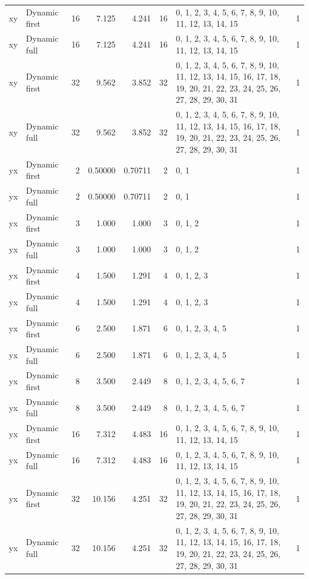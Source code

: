 \documentclass[10pt,a4paper]{article}
\begin{document}
\begin{longtable}{@{}p{23mm}p{29mm}rrrrp{36mm}r@{}}
xy & Dynamic first & 16 & 7.125 & 4.241 & 16 & 0, 1, 2, 3, 4, 5, 6, 7, 8, 9, 10, 11, 12, 13, 14, 15 & 1 \\
xy & Dynamic full & 16 & 7.125 & 4.241 & 16 & 0, 1, 2, 3, 4, 5, 6, 7, 8, 9, 10, 11, 12, 13, 14, 15 & 1 \\
xy & Dynamic first & 32 & 9.562 & 3.852 & 32 & 0, 1, 2, 3, 4, 5, 6, 7, 8, 9, 10, 11, 12, 13, 14, 15, 16, 17, 18, 19, 20, 21, 22, 23, 24, 25, 26, 27, 28, 29, 30, 31 & 1 \\
xy & Dynamic full & 32 & 9.562 & 3.852 & 32 & 0, 1, 2, 3, 4, 5, 6, 7, 8, 9, 10, 11, 12, 13, 14, 15, 16, 17, 18, 19, 20, 21, 22, 23, 24, 25, 26, 27, 28, 29, 30, 31 & 1 \\
yx & Dynamic first & 2 & 0.50000 & 0.70711 & 2 & 0, 1 & 1 \\
yx & Dynamic full & 2 & 0.50000 & 0.70711 & 2 & 0, 1 & 1 \\
yx & Dynamic first & 3 & 1.000 & 1.000 & 3 & 0, 1, 2 & 1 \\
yx & Dynamic full & 3 & 1.000 & 1.000 & 3 & 0, 1, 2 & 1 \\
yx & Dynamic first & 4 & 1.500 & 1.291 & 4 & 0, 1, 2, 3 & 1 \\
yx & Dynamic full & 4 & 1.500 & 1.291 & 4 & 0, 1, 2, 3 & 1 \\
yx & Dynamic first & 6 & 2.500 & 1.871 & 6 & 0, 1, 2, 3, 4, 5 & 1 \\
yx & Dynamic full & 6 & 2.500 & 1.871 & 6 & 0, 1, 2, 3, 4, 5 & 1 \\
yx & Dynamic first & 8 & 3.500 & 2.449 & 8 & 0, 1, 2, 3, 4, 5, 6, 7 & 1 \\
yx & Dynamic full & 8 & 3.500 & 2.449 & 8 & 0, 1, 2, 3, 4, 5, 6, 7 & 1 \\
yx & Dynamic first & 16 & 7.312 & 4.483 & 16 & 0, 1, 2, 3, 4, 5, 6, 7, 8, 9, 10, 11, 12, 13, 14, 15 & 1 \\
yx & Dynamic full & 16 & 7.312 & 4.483 & 16 & 0, 1, 2, 3, 4, 5, 6, 7, 8, 9, 10, 11, 12, 13, 14, 15 & 1 \\
yx & Dynamic first & 32 & 10.156 & 4.251 & 32 & 0, 1, 2, 3, 4, 5, 6, 7, 8, 9, 10, 11, 12, 13, 14, 15, 16, 17, 18, 19, 20, 21, 22, 23, 24, 25, 26, 27, 28, 29, 30, 31 & 1 \\
yx & Dynamic full & 32 & 10.156 & 4.251 & 32 & 0, 1, 2, 3, 4, 5, 6, 7, 8, 9, 10, 11, 12, 13, 14, 15, 16, 17, 18, 19, 20, 21, 22, 23, 24, 25, 26, 27, 28, 29, 30, 31 & 1 \\
\end{longtable}\normalsize\setlength{\tabcolsep}{6pt}
\clearpage
\end{document}
